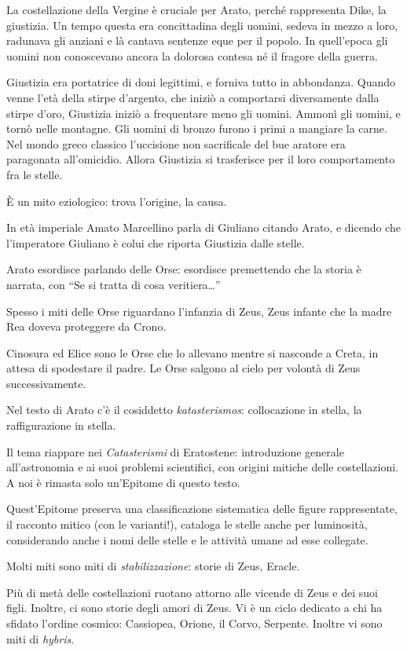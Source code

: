 \documentclass[main.tex]{subfiles}
\begin{document}
La costellazione della Vergine è cruciale per Arato, perché rappresenta Dike, la giustizia. Un tempo questa era concittadina degli uomini, sedeva in mezzo a loro, radunava gli anziani e là cantava sentenze eque per il popolo. In quell'epoca gli uomini non conoscevano ancora la dolorosa contesa né il fragore della guerra.

Giustizia era portatrice di doni legittimi, e forniva tutto in abbondanza.
Quando venne l'età della stirpe d'argento, che iniziò a comportarsi diversamente dalla stirpe d'oro, Giustizia iniziò a frequentare meno gli uomini. 
Ammonì gli uomini, e tornò nelle montagne. 
Gli uomini di bronzo furono i primi a mangiare la carne.
Nel mondo greco classico l'uccisione non sacrificale del bue aratore era paragonata all'omicidio.
Allora Giustizia si trasferisce per il loro comportamento fra le stelle.

È un mito eziologico: trova l'origine, la causa.

In età imperiale Amato Marcellino parla di Giuliano citando Arato, e dicendo che l'imperatore Giuliano è colui che riporta Giustizia dalle stelle.

Arato esordisce parlando delle Orse: esordisce premettendo che la storia è narrata, con ``Se si tratta di cosa veritiera\dots''

Spesso i miti delle Orse riguardano l'infanzia di Zeus, Zeus infante che la madre Rea doveva proteggere da Crono. 

Cinosura ed Elice sono le Orse che lo allevano mentre si nasconde a Creta, in attesa di spodestare il padre.
Le Orse salgono al cielo per volontà di Zeus successivamente.

Nel testo di Arato c'è il cosiddetto \emph{katasterismos}: collocazione in stella, la raffigurazione in stella.

Il tema riappare nei \emph{Catasterismi} di Eratostene: introduzione generale all'astronomia e ai suoi problemi scientifici, con origini mitiche delle costellazioni. 
A noi è rimasta solo un'Epitome di questo testo.

Quest'Epitome preserva una classificazione sistematica delle figure rappresentate, il racconto mitico (con le varianti!), cataloga le stelle anche per luminosità, considerando anche i nomi delle stelle e le attività umane ad esse collegate.

Molti miti sono miti di \emph{stabilizzazione}: storie di Zeus, Eracle. 

Più di metà delle costellazioni ruotano attorno alle vicende di Zeus e dei suoi figli. Inoltre, ci sono storie degli amori di Zeus.
Vi è un ciclo dedicato a chi ha sfidato l'ordine cosmico: Cassiopea, Orione, il Corvo, Serpente.
Inoltre vi sono miti di \emph{hybris}.
\end{document}

